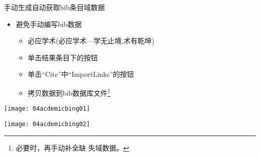 \documentclass[fontset = none, t]{ctexbeamer}
\begin{document}
\begin{frame}[fragile]{手动生成}{自动获取bib条目域数据}
  \begin{spacing}{1.5}
    \begin{itemize}
    \item 避免手动编写bib数据
      \begin{itemize}
      \item 必应学术(必应学术---学无止境,术有乾坤)
      \item 单击结果条目下的\alert{}按钮
      \item 单击\enquote{Cite}中\enquote{ImportLinks}的\alert{}按钮
      \item 拷贝数据到bib数据库文件\footnote[frame,2]{必要时，再手动补全缺
          失域数据。}
      \end{itemize}
    \end{itemize}    
    \begin{center}
      \begin{annotatedFigure}
        {\texttt{[image: 04acdemicbing01]}}
      \end{annotatedFigure}\quad
      \begin{annotatedFigure}
        {\texttt{[image: 04acdemicbing02]}}
      \end{annotatedFigure}
    \end{center}
  \end{spacing}
\end{frame}
\end{document}
